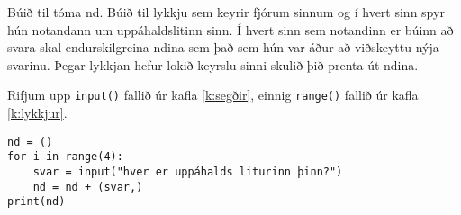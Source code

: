 \begin{exercise}\label{nd4}
Búið til tóma nd.
Búið til lykkju sem keyrir fjórum sinnum og í hvert sinn spyr hún notandann um uppáhaldslitinn sinn.
Í hvert sinn sem notandinn er búinn að svara skal endurskilgreina ndina sem það sem hún var áður að viðskeyttu nýja svarinu.
Þegar lykkjan hefur lokið keyrslu sinni skulið þið prenta út ndina.
\end{exercise}
\begin{Answer}[ref={nd4}]
Rifjum upp  \texttt{input()} fallið úr kafla \ref{k:segðir}, einnig \texttt{range()} fallið úr kafla \ref{k:lykkjur}.
\begin{lstlisting}
nd = ()
for i in range(4):
	svar = input("hver er uppáhalds liturinn þinn?")
	nd = nd + (svar,)
print(nd)\end{lstlisting}
\end{Answer}
